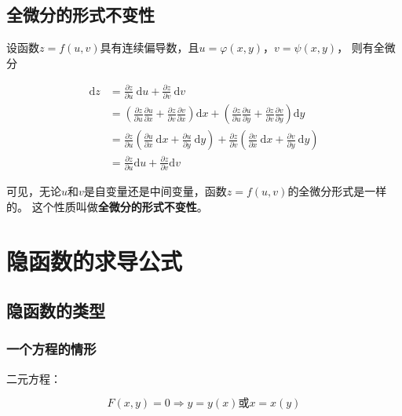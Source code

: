 \documentclass[12pt, a4paper]{article}
\numberwithin{equation}{section}
\newcommand{\rmd}{\mathrm{d}}
\begin{document}
\subsection{全微分的形式不变性}

    设函数\(z=f\left(u, v\right)\)具有连续偏导数，且\(u=\varphi\left(x,y\right)\)，\(v=\psi\left(x,y\right)\)，
    则有全微分

    \begin{equation}
        \begin{aligned}
            \mathrm{d} z&=\frac{\partial z}{\partial u} \mathrm{~d} u+\frac{\partial z}{\partial v} \mathrm{~d} v \\
            &=\left(\frac{\partial z}{\partial u} \frac{\partial u}{\partial x}+\frac{\partial z}{\partial v} \frac{\partial v}{\partial x}\right) \mathrm{d} x+\left(\frac{\partial z}{\partial u} \frac{\partial u}{\partial y}+
                \frac{\partial z}{\partial v} \frac{\partial v}{\partial y}\right) \mathrm{d} y \\
            &=\frac{\partial z}{\partial u}\left(\frac{\partial u}{\partial x} \mathrm{~d} x+\frac{\partial u}{\partial y} \mathrm{~d} y\right)+\frac{\partial z}{\partial v}\left(\frac{\partial v}{\partial x} \mathrm{~d} x
                +\frac{\partial v}{\partial y} \mathrm{~d} y\right) \\
            &=\frac{\partial z}{\partial u} \rmd u+\frac{\partial z}{\partial v} \rmd v
        \end{aligned}
    \end{equation}

    可见，无论\(u\)和\(v\)是自变量还是中间变量，函数\(z=f\left(u,v\right)\)的全微分形式是一样的。
    这个性质叫做\textbf{全微分的形式不变性}。

\section{隐函数的求导公式}

\subsection{隐函数的类型}

\subsubsection{一个方程的情形}

    二元方程：

    \[
        F\left(x,y\right)=0 \Longrightarrow y=y\left(x\right) \text{或} x=x\left(y\right)
    \]
    
\end{document}
